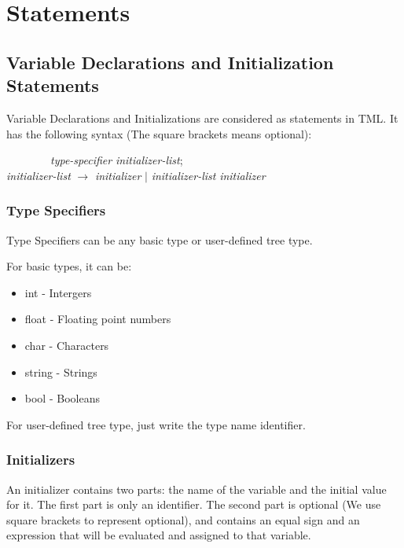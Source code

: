 \documentclass[12pt,psfig,a4]{article}
\begin{document}
\section{Statements}

\subsection{Variable Declarations and Initialization Statements}
Variable Declarations and Initializations are considered as statements in TML. It has the following syntax (The square brackets means optional):

\begin{code}
\begin{tabbing}
~~~~~~~~\= \textit{type-specifier} \textit{initializer-list}; \\
\> \textit{initializer-list}  $\rightarrow$ \textit{initializer} $\mid$ \textit{initializer-list} \textit{initializer}
\end{tabbing}
\end{code}

\subsubsection{Type Specifiers}
Type Specifiers can be any basic type or user-defined tree type.

For basic types, it can be:
\begin{itemize}
\setlength{\itemsep}{0pt}
\setlength{\parskip}{0pt}
\item int - Intergers
\item float - Floating point numbers
\item char - Characters
\item string - Strings
\item bool - Booleans
\end{itemize}

For user-defined tree type, just write the type name identifier.

\subsubsection{Initializers}
An initializer contains two parts: the name of the variable and the initial value for it. The first part is only an identifier. The second part is optional (We use square brackets to represent optional), and contains an equal sign and an expression that will be evaluated and assigned to that variable.
\end{document}
